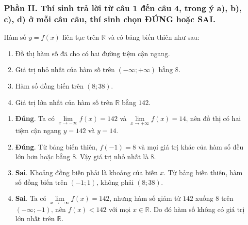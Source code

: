 \subsubsection*{Phần II. Thí sinh trả lời từ câu 1 đến câu 4, trong ý a), b), c), d) ở mỗi câu câu, thí sinh chọn ĐÚNG hoặc SAI.}
\setcounter{bt}{0}\setcounter{bt}{0}
\begin{baitap}
	Hàm số $y = f(x)$ liên tục trên $\mathbb{R}$ và có bảng biến thiên như sau:
	\begin{center}
	\end{center}
	\begin{enumerate}
		\item Đồ thị hàm số đã cho có hai đường tiệm cận ngang.
		\item Giá trị nhỏ nhất của hàm số trên $(-\infty; +\infty)$ bằng $8$.
		\item Hàm số đồng biến trên $(8; 38)$.
		\item Giá trị lớn nhất của hàm số trên $\mathbb{R}$ bằng $142$.
	\end{enumerate}
	\begin{traloi}
		
		\begin{enumerate}
			\item \textbf{Đúng}. Ta có \(\lim\limits_{x\to-\infty}f(x)=142\) và \(\lim\limits_{x\to+\infty}f(x)=14\), nên đồ thị có hai tiệm cận ngang \(y=142\) và \(y=14\).
			
			\item \textbf{Đúng}. Từ bảng biến thiên, \(f(-1)=8\) và mọi giá trị khác của hàm số đều lớn hơn hoặc bằng \(8\). Vậy giá trị nhỏ nhất là \(8\).
			
			\item \textbf{Sai}. Khoảng đồng biến phải là khoảng của biến \(x\). Từ bảng biến thiên, hàm số đồng biến trên \((-1;1)\), không phải \((8;38)\).
			
			\item \textbf{Sai}. Ta có \(\lim\limits_{x\to-\infty}f(x)=142\), nhưng hàm số giảm từ \(142\) xuống \(8\) trên \((-\infty;-1)\), nên \(f(x)<142\) với mọi \(x\in\mathbb R\). Do đó hàm số không có giá trị lớn nhất trên \(\mathbb R\).
		\end{enumerate}
	\end{traloi}
\end{baitap}

